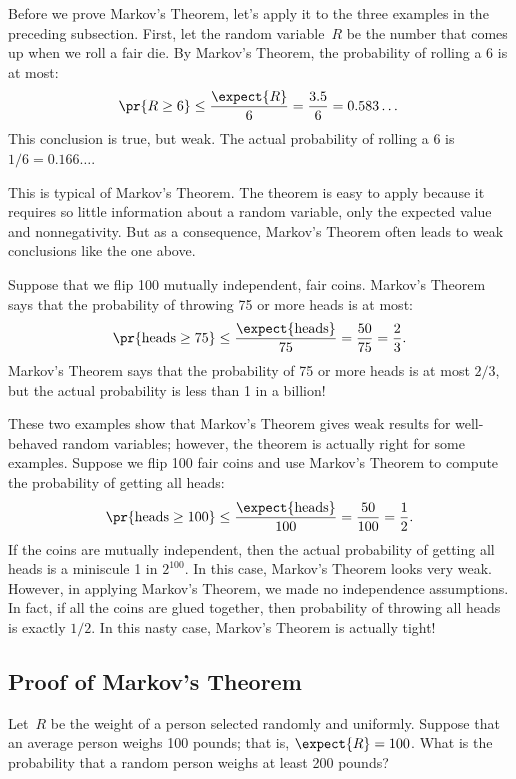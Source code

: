 \begin{editingnotes}

Before we prove Markov's Theorem, let's apply it to the three examples in
the preceding subsection.  First, let the random variable~$R$ be the
number that comes up when we roll a fair die.  By Markov's Theorem, the
probability of rolling a 6 is at most:
\[
\pr{R \geq 6} \leq \frac{\expect{R}}{6} = \frac{3.5}{6} = 0.583\dots
\]
This conclusion is true, but weak.  The actual probability of rolling
a 6 is $1/6 = 0.166\dots$.

This is typical of Markov's Theorem.  The theorem is easy to apply
because it requires so little information about a random variable,
only the expected value and nonnegativity.  But as a consequence,
Markov's Theorem often leads to weak conclusions like the one above.

Suppose that we flip 100 mutually independent, fair coins.  Markov's
Theorem says that the probability of throwing 75 or more heads is at
most:
\[
\pr{\text{heads} \geq 75} \leq \frac{\expect{\text{heads}}}{75} =
\frac{50}{75} = \frac{2}{3}.
\]
Markov's Theorem says that the probability of 75 or more heads is at
most $2/3$, but the actual probability is less than 1 in a
billion!

These two examples show that Markov's Theorem gives weak results for
well-behaved random variables; however, the theorem is actually right
for some examples.  Suppose we flip 100 fair coins and use Markov's
Theorem to compute the probability of getting all heads:
\[
\pr{\text{heads} \geq 100} \leq \frac{\expect{\text{heads}}}{100} =
\frac{50}{100} = \frac{1}{2}.
\]
If the coins are mutually independent, then the actual probability of
getting all heads is a miniscule 1 in $2^{100}$.  In this case, Markov's
Theorem looks very weak.  However, in applying Markov's Theorem, we made
no independence assumptions.  In fact, if all the coins are glued
together, then probability of throwing all heads is exactly $1/2$.
In this nasty case, Markov's Theorem is actually tight!

\subsection{Proof of Markov's Theorem}

Let~$R$ be the weight of a person selected randomly and uniformly.
Suppose that an average person weighs 100 pounds; that is, $\expect{R} =
100$.  What is the probability that a random person weighs at least
200 pounds?


\end{editingnotes}
